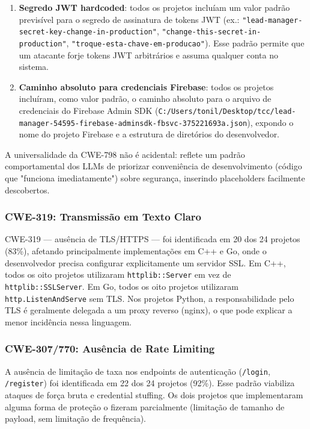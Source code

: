 \documentclass[12pt]{article}
\begin{document}
\begin{enumerate}
  \item \textbf{Segredo JWT hardcoded}: todos os projetos incluíam um valor padrão previsível para o segredo de assinatura de tokens JWT (ex.: \texttt{"lead-manager-secret-key-change-in-production"}, \texttt{"change-this-secret-in-production"}, \texttt{"troque-esta-chave-em-producao"}). Esse padrão permite que um atacante forje tokens JWT arbitrários e assuma qualquer conta no sistema.
  \item \textbf{Caminho absoluto para credenciais Firebase}: todos os projetos incluíram, como valor padrão, o caminho absoluto para o arquivo de credenciais do Firebase Admin SDK (\texttt{C:/Users/tonil/Desktop/tcc/lead-manager-54595-firebase-adminsdk-fbsvc-375221693a.json}), expondo o nome do projeto Firebase e a estrutura de diretórios do desenvolvedor.
\end{enumerate}

A universalidade da CWE-798 não é acidental: reflete um padrão comportamental dos LLMs de priorizar conveniência de desenvolvimento (código que "funciona imediatamente") sobre segurança, inserindo placeholders facilmente descobertos.

\subsubsection{CWE-319: Transmissão em Texto Claro}

CWE-319 — ausência de TLS/HTTPS — foi identificada em 20 dos 24 projetos (83\%), afetando principalmente implementações em C++ e Go, onde o desenvolvedor precisa configurar explicitamente um servidor SSL. Em C++, todos os oito projetos utilizaram \texttt{httplib::Server} em vez de \texttt{httplib::SSLServer}. Em Go, todos os oito projetos utilizaram \texttt{http.ListenAndServe} sem TLS. Nos projetos Python, a responsabilidade pelo TLS é geralmente delegada a um proxy reverso (nginx), o que pode explicar a menor incidência nessa linguagem.

\subsubsection{CWE-307/770: Ausência de Rate Limiting}

A ausência de limitação de taxa nos endpoints de autenticação (\texttt{/login}, \texttt{/register}) foi identificada em 22 dos 24 projetos (92\%). Esse padrão viabiliza ataques de força bruta e credential stuffing. Os dois projetos que implementaram alguma forma de proteção o fizeram parcialmente (limitação de tamanho de payload, sem limitação de frequência).
\end{document}
